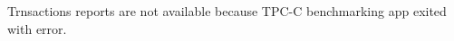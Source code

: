 \documentclass[../../main.tex]{subfiles}
\begin{document}
    Trnsactions reports are not available because TPC-C benchmarking app exited with error.
\end{document}
